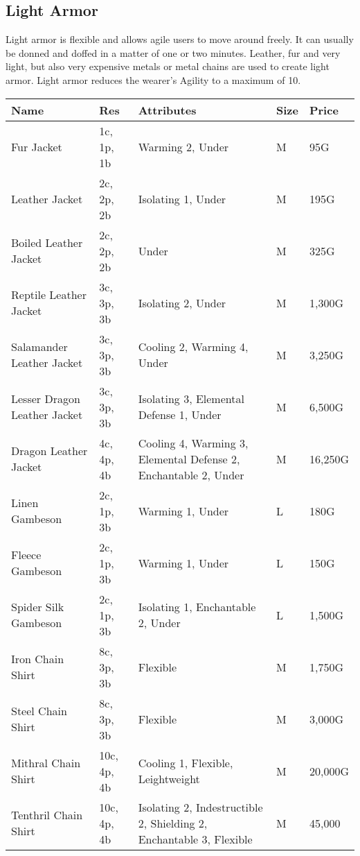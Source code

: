 \subsection{Light Armor}

Light armor is flexible and allows agile users to move around freely. It can usually be donned and doffed in a matter of one or two minutes. Leather, fur and very light, but also very expensive metals or metal chains are used to create light armor.
Light armor reduces the wearer's Agility to a maximum of 10. 

\begin{longtable}{p{3.5cm} | p{1.5cm} | p{5cm} | p{1cm} | p{1.25cm}}
	Name & Res &  Attributes & Size & Price\\ \hline
	Fur Jacket & 1c, 1p, 1b & Warming 2, Under & M & 95G\\
	
	Leather Jacket & 2c, 2p, 2b & Isolating 1, Under & M & 195G\\
	
	Boiled Leather Jacket & 2c, 2p, 2b & Under & M & 325G\\
	
	Reptile Leather Jacket & 3c, 3p, 3b & Isolating 2, Under & M & 1,300G\\
	
	Salamander Leather Jacket & 3c, 3p, 3b & Cooling 2, Warming 4, Under & M & 3,250G\\
	
	Lesser Dragon Leather Jacket & 3c, 3p, 3b & Isolating 3, Elemental Defense 1, Under & M & 6,500G\\
	
	Dragon Leather Jacket & 4c, 4p, 4b & Cooling 4, Warming 3, Elemental Defense 2, Enchantable 2, Under & M & 16,250G\\
	
	Linen Gambeson & 2c, 1p, 3b & Warming 1, Under & L & 180G\\
	
	Fleece Gambeson & 2c, 1p, 3b & Warming 1, Under & L & 150G\\
	
	Spider Silk Gambeson & 2c, 1p, 3b & Isolating 1, Enchantable 2, Under & L & 1,500G\\
	
	Iron Chain Shirt & 8c, 3p, 3b & Flexible & M & 1,750G\\
	
	Steel Chain Shirt & 8c, 3p, 3b & Flexible & M & 3,000G\\
	
	Mithral Chain Shirt & 10c, 4p, 4b & Cooling 1, Flexible, Leightweight & M & 20,000G\\
	
	Tenthril Chain Shirt & 10c, 4p, 4b & Isolating 2, Indestructible 2, Shielding 2, Enchantable 3, Flexible & M & 45,000\\
\end{longtable}